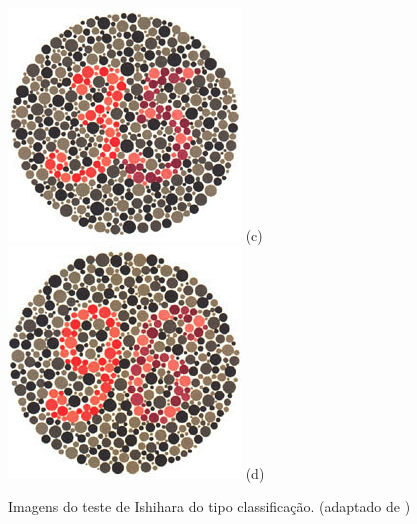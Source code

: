 \documentclass[	12pt, Times, openright, twoside, a4paper, english, brazil]{abntex2}
\begin{document}
\begin{apendicesenv}
\begin{figure}[!htb]
\centering
{\includegraphics[width=\linewidth]{ishihara-classificacao/plate24.jpg}}
(c)
\endminipage\hfill
{}
\centering
{\includegraphics[width=\linewidth]{ishihara-classificacao/plate25.jpg}}
(d)
\endminipage\hfill

\caption{Imagens do teste de Ishihara do tipo classificação. (adaptado de )}
\label{fig:apendiceClassificacao}

\end{figure}


\end{apendicesenv}
\end{document}

